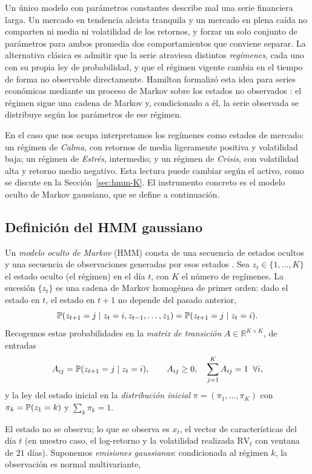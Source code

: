 Un único modelo con parámetros constantes describe mal una serie financiera larga. Un mercado en tendencia alcista tranquila y un mercado en plena caída no comparten ni media ni volatilidad de los retornos, y forzar un solo conjunto de parámetros para ambos promedia dos comportamientos que conviene separar. La alternativa clásica es admitir que la serie atraviesa distintos \emph{regímenes}, cada uno con su propia ley de probabilidad, y que el régimen vigente cambia en el tiempo de forma no observable directamente. Hamilton formalizó esta idea para series económicas mediante un proceso de Markov sobre los estados no observados \cite{hamilton1989}: el régimen sigue una cadena de Markov y, condicionado a él, la serie observada se distribuye según los parámetros de ese régimen.

En el caso que nos ocupa interpretamos los regímenes como estados de mercado: un régimen de \emph{Calma}, con retornos de media ligeramente positiva y volatilidad baja; un régimen de \emph{Estrés}, intermedio; y un régimen de \emph{Crisis}, con volatilidad alta y retorno medio negativo. Esta lectura puede cambiar según el activo, como se discute en la Sección~\ref{sec:hmm-K}. El instrumento concreto es el modelo oculto de Markov gaussiano, que se define a continuación.

\subsection{Definición del HMM gaussiano}
\label{sec:hmm-def}

Un \emph{modelo oculto de Markov} (HMM) consta de una secuencia de estados ocultos y una secuencia de observaciones generadas por esos estados \cite{rabiner1989, cappe2005}. Sea $z_t \in \{1, \dots, K\}$ el estado oculto (el régimen) en el día $t$, con $K$ el número de regímenes. La sucesión $\{z_t\}$ es una cadena de Markov homogénea de primer orden: dado el estado en $t$, el estado en $t+1$ no depende del pasado anterior,
\[
\mathbb{P}(z_{t+1} = j \mid z_t = i, z_{t-1}, \dots, z_1) = \mathbb{P}(z_{t+1} = j \mid z_t = i).
\]
Recogemos estas probabilidades en la \emph{matriz de transición} $A \in \mathbb{R}^{K \times K}$, de entradas
\[
A_{ij} = \mathbb{P}(z_{t+1} = j \mid z_t = i), \qquad A_{ij} \ge 0, \quad \sum_{j=1}^{K} A_{ij} = 1 \;\;\forall i,
\]
y la ley del estado inicial en la \emph{distribución inicial} $\pi = (\pi_1, \dots, \pi_K)$ con $\pi_k = \mathbb{P}(z_1 = k)$ y $\sum_k \pi_k = 1$.

El estado no se observa; lo que se observa es $x_t$, el vector de características del día $t$ (en nuestro caso, el log-retorno y la volatilidad realizada $\mathrm{RV}_t$ con ventana de $21$ días). Suponemos \emph{emisiones gaussianas}: condicionada al régimen $k$, la observación es normal multivariante,

